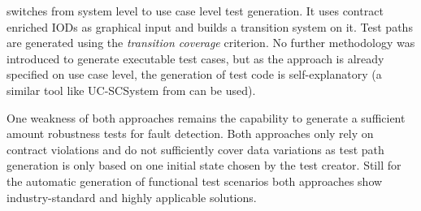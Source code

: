 \cite{ClementineNebut2006} switches from system level to use case level test generation. It uses contract enriched IODs as graphical input and builds a transition system on it. Test paths are generated using the \textit{transition coverage} criterion. No further methodology was introduced to generate executable test cases, but as the approach is already specified on use case level, the generation of test code is self-explanatory (a similar tool like UC-SCSystem from \cite{ClementineNebut2006} can be used).

One weakness of both approaches remains the capability to generate a sufficient amount robustness tests for fault detection. Both approaches only rely on contract violations and do not sufficiently cover data variations as test path generation is only based on one initial state chosen by the test creator. Still for the automatic generation of functional test scenarios both approaches show industry-standard and highly applicable solutions.